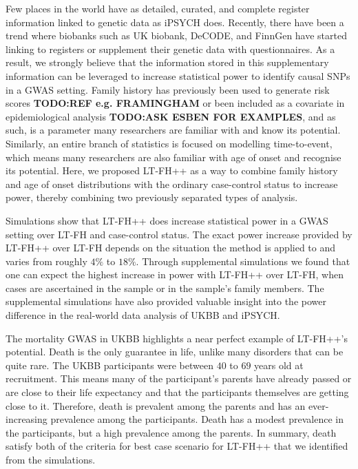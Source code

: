 
Few places in the world have as detailed, curated, and complete register information linked to genetic data as iPSYCH does. Recently, there have been a trend where biobanks such as UK biobank, DeCODE, and FinnGen have started linking to registers or supplement their genetic data with questionnaires. As a result, we strongly believe that the information stored in this supplementary information can be leveraged to increase statistical power to identify causal SNPs in a GWAS setting. Family history has previously been used to generate risk scores \textbf{TODO:REF e.g. FRAMINGHAM} or been included as a covariate in epidemiological analysis \textbf{TODO:ASK ESBEN FOR EXAMPLES}, and as such, is a parameter many researchers are familiar with and know its potential. Similarly, an entire branch of statistics is focused on modelling time-to-event, which means many researchers are also familiar with age of onset and recognise its potential. Here, we proposed LT-FH++ as a way to combine family history and age of onset distributions with the ordinary case-control status to increase power, thereby combining two previously separated types of analysis.

Simulations show that LT-FH++ does increase statistical power in a GWAS setting over LT-FH and case-control status. The exact power increase provided by LT-FH++ over LT-FH depends on the situation the method is applied to and varies from roughly $ 4\% $ to $ 18\% $. Through supplemental simulations we found that one can expect the highest increase in power with LT-FH++ over LT-FH, when cases are ascertained in the sample or in the sample's family members. The supplemental simulations have also provided valuable insight into the power difference in the real-world data analysis of UKBB and iPSYCH.

The mortality GWAS in UKBB highlights a near perfect example of LT-FH++'s potential. Death is the only guarantee in life, unlike many disorders that can be quite rare. The UKBB participants were between $ 40 $ to $ 69 $ years old at recruitment. This means many of the participant's parents have already passed or are close to their life expectancy and that the participants themselves are getting close to it. Therefore, death is prevalent among the parents and has an ever-increasing prevalence among the participants. Death has a modest prevalence in the participants, but a high prevalence among the parents. In summary, death satisfy both of the criteria for best case scenario for LT-FH++ that we identified from the simulations. 

